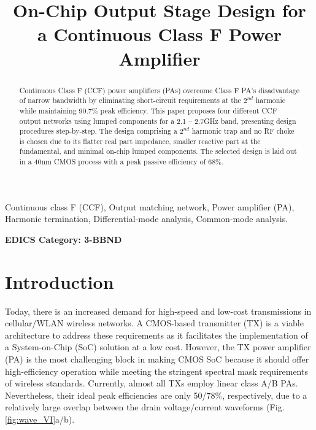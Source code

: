 \documentclass[conference]{IEEEtran}
\begin{document}
\title{On-Chip Output Stage Design for a  Continuous Class F Power Amplifier}

\author{ 
}

\maketitle

\begin{abstract}
Continuous Class F (CCF) power amplifiers (PAs) overcome Class F PA's disadvantage of narrow bandwidth by eliminating short-circuit requirements at the $2^{nd}$ harmonic while maintaining 90.7\% peak efficiency. This paper proposes four different CCF output networks using lumped components for a 2.1 -- 2.7GHz band, presenting design procedures step-by-step. The design comprising a $2^{nd}$ harmonic trap and no RF choke is chosen due to its  flatter real part impedance, smaller reactive part at the fundamental, and  minimal on-chip lumped components. The selected design is laid out in a 40nm CMOS process with a peak passive efficiency of 68\%.
\end{abstract}

\vspace{1mm}
\begin{IEEEkeywords}
Continuous class F (CCF), Output matching network, Power amplifier (PA), Harmonic termination, Differential-mode analysis, Common-mode analysis. 
\end{IEEEkeywords}


\ifCLASSOPTIONpeerreview
\begin{center} \bfseries EDICS Category: 3-BBND \end{center}
\fi

\IEEEpeerreviewmaketitle

\section{Introduction}
Today, there is an increased demand for high-speed and low-cost transmissions in cellular/WLAN wireless networks. A CMOS-based transmitter (TX) is a viable architecture to address these requirements as it facilitates the implementation of a System-on-Chip (SoC) solution at a low cost. However, the TX power amplifier (PA) is the most challenging block in making CMOS SoC because it should offer high-efficiency operation while meeting the stringent spectral mask requirements of wireless standards. Currently, almost all TXs employ linear class A/B PAs. Nevertheless, their ideal  peak efficiencies are only 50/78\%, respectively, due to a relatively large overlap between the drain voltage/current  waveforms (Fig. \ref{fig:wave_VI}a/b).
\end{document}
